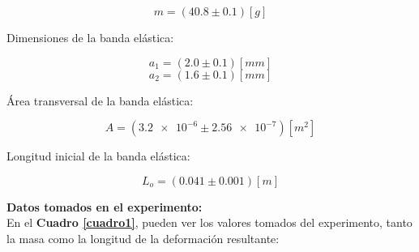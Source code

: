 \documentclass[letter,11pt]{article}
\begin{document}
\begin{equation*}
    m = (40.8 \pm 0.1)[g]
\end{equation*}
\vspace{0.10cm}

Dimensiones de la banda elástica:

\begin{equation*}
    a_1 = (2.0 \pm 0.1)[mm]
\end{equation*}
\begin{equation*}
    a_2 = (1.6 \pm 0.1)[mm]
\end{equation*}
\vspace{0.10cm}

Área transversal de la banda elástica:

\begin{equation*}
    A = (\num{3.2e-6} \pm \num{2.56e-7})[m^2]
\end{equation*}
\vspace{0.10cm}

Longitud inicial de la banda elástica:

\begin{equation*}
    L_o = (0.041 \pm 0.001)[m]
\end{equation*}

\vspace{0.35cm}
\textbf{Datos tomados en el experimento:} \\

En el \textbf{Cuadro \ref{cuadro1}}, pueden ver los valores tomados del 
experimento, tanto la masa como la longitud de la deformación resultante:
\end{document}
